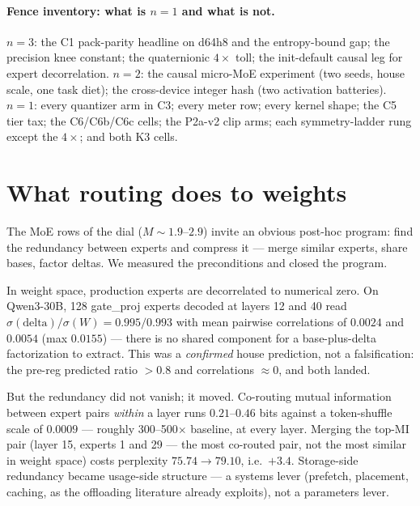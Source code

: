 \documentclass[11pt]{article}
\begin{document}
\paragraph{Fence inventory: what is $n{=}1$ and what is not.}
$n{=}3$: the C1 pack-parity headline on d64h8 and the entropy-bound gap;
the precision knee constant; %
the quaternionic $4\times$ toll; %
the init-default causal leg for expert decorrelation. %
$n{=}2$: the causal micro-MoE experiment (two seeds, house scale, one task
diet); %
the cross-device integer hash (two activation batteries). %
$n{=}1$: every quantizer arm in C3; %
every meter row; every kernel shape; %
the C5 tier tax; the C6/C6b/C6c cells; the P2a-v2 clip arms;
each symmetry-ladder rung except the $4\times$; and both K3 cells.

\section{What routing does to weights}
\label{sec:routing}

The MoE rows of the dial ($M \sim 1.9$--$2.9$) invite an obvious post-hoc
program: find the redundancy between experts and compress it --- merge similar
experts, share bases, factor deltas. We measured the preconditions and closed the
program.

In weight space, production experts are decorrelated to numerical zero. On
Qwen3-30B, 128 gate\_proj experts decoded at layers 12 and 40 read
$\sigma(\text{delta})/\sigma(W) = 0.995 / 0.993$ with mean pairwise correlations
of $0.0024$ and $0.0054$ (max $0.0155$) --- there is no shared component for a
base-plus-delta factorization to extract. %
This was a \emph{confirmed} house prediction, not a falsification: the pre-reg
predicted ratio $>0.8$ and correlations $\approx 0$, and both landed.

But the redundancy did not vanish; it moved. Co-routing mutual information
between expert pairs \emph{within} a layer runs $0.21$--$0.46$ bits against a
token-shuffle scale of $0.0009$ --- roughly 300--500$\times$ baseline, at every
layer. %
Merging the top-MI pair (layer 15, experts 1 and 29 --- the most co-routed pair,
not the most similar in weight space) costs perplexity $75.74 \to 79.10$, i.e.\
$+3.4$. %
Storage-side redundancy became usage-side structure --- a systems lever
(prefetch, placement, caching, as the offloading literature already exploits),
not a parameters lever. %
\end{document}

